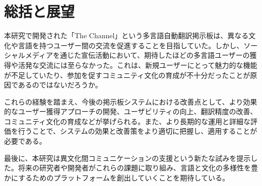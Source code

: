 \documentclass[b5paper,12pt,dvipdfmx]{jsreport}
\begin{document}
\section{総括と展望}

本研究で開発された「The Channel」という多言語自動翻訳掲示板は、異なる文化や言語を持つユーザー間の交流を促進することを目指していた。しかし、ソーシャルメディアを通じた宣伝活動において、期待したほどの多言語ユーザーの獲得や活発な交流には至らなかった。これは、新規ユーザーにとって魅力的な機能が不足していたり、参加を促すコミュニティ文化の育成が不十分だったことが原因であるのではないだろうか。

これらの経験を踏まえ、今後の掲示板システムにおける改善点として、より効果的なユーザー獲得アプローチの開発、ユーザビリティの向上、翻訳精度の改善、コミュニティ文化の育成などが挙げられる。また、より長期的な運用と詳細な評価を行うことで、システムの効果と改善策をより適切に把握し、適用することが必要である。

最後に、本研究は異文化間コミュニケーションの支援という新たな試みを提示した。将来の研究者や開発者がこれらの課題に取り組み、言語と文化の多様性を豊かにするためのプラットフォームを創出していくことを期待している。







\end{document}
